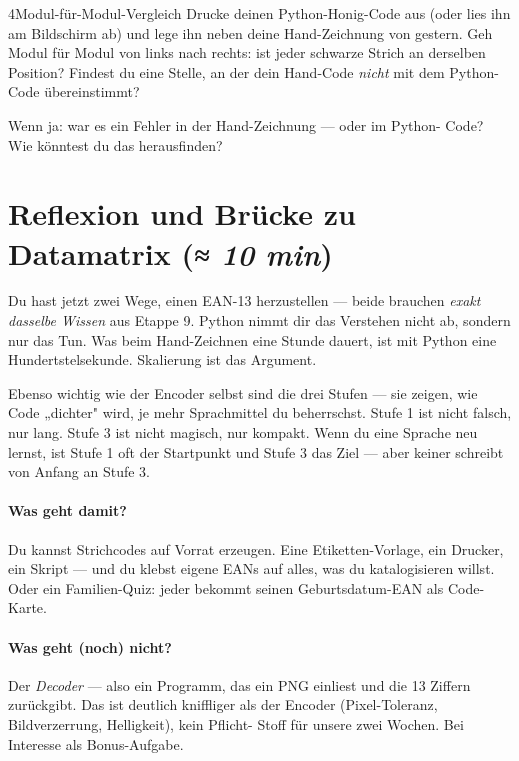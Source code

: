 \begin{bleistiftuebung}{4}{Modul-für-Modul-Vergleich}
Drucke deinen Python-Honig-Code aus (oder lies ihn am Bildschirm
ab) und lege ihn neben deine Hand-Zeichnung von gestern. Geh Modul
für Modul von links nach rechts: ist jeder schwarze Strich an
derselben Position? Findest du eine Stelle, an der dein Hand-Code
\emph{nicht} mit dem Python-Code übereinstimmt?

Wenn ja: war es ein Fehler in der Hand-Zeichnung — oder im Python-
Code? Wie könntest du das herausfinden?
\end{bleistiftuebung}

\section{Reflexion und Brücke zu Datamatrix \normalfont(\textit{≈ 10 min})}

Du hast jetzt zwei Wege, einen EAN-13 herzustellen — beide brauchen
\emph{exakt dasselbe Wissen} aus Etappe 9. Python nimmt dir das
Verstehen nicht ab, sondern nur das Tun. Was beim Hand-Zeichnen eine
Stunde dauert, ist mit Python eine Hundertstelsekunde. Skalierung ist
das Argument.

Ebenso wichtig wie der Encoder selbst sind die drei Stufen — sie
zeigen, wie Code „dichter" wird, je mehr Sprachmittel du beherrschst.
Stufe 1 ist nicht falsch, nur lang. Stufe 3 ist nicht magisch, nur
kompakt. Wenn du eine Sprache neu lernst, ist Stufe 1 oft der
Startpunkt und Stufe 3 das Ziel — aber keiner schreibt von Anfang
an Stufe 3.

\paragraph{Was geht damit?}
Du kannst Strichcodes auf Vorrat erzeugen. Eine Etiketten-Vorlage,
ein Drucker, ein Skript — und du klebst eigene EANs auf alles, was
du katalogisieren willst. Oder ein Familien-Quiz: jeder bekommt
seinen Geburtsdatum-EAN als Code-Karte.

\paragraph{Was geht (noch) nicht?}
Der \emph{Decoder} — also ein Programm, das ein PNG einliest und
die 13 Ziffern zurückgibt. Das ist deutlich kniffliger als der
Encoder (Pixel-Toleranz, Bildverzerrung, Helligkeit), kein Pflicht-
Stoff für unsere zwei Wochen. Bei Interesse als Bonus-Aufgabe.

